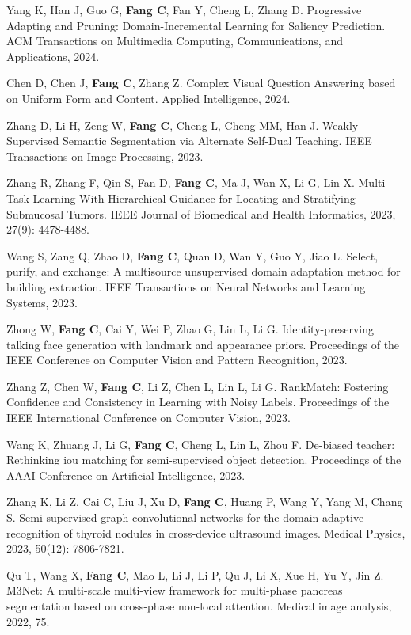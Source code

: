 \documentclass[a4paper,36pt]{article}
\newcommand{\tb}[1]{\textbf{#1}}
\newcommand{\resumeItemWithoutTitle}[1]{
  \item\justifying\small{
    {#1 \vspace{-2pt}}
  }
}
\begin{document}
\resumeItemWithoutTitle{Yang K, Han J, Guo G, \tb{Fang C}, Fan Y, Cheng L, Zhang D. Progressive Adapting and Pruning: Domain-Incremental Learning for Saliency Prediction. ACM Transactions on Multimedia Computing, Communications, and Applications, 2024.}

\resumeItemWithoutTitle{Chen D, Chen J, \tb{Fang C}, Zhang Z. Complex Visual Question Answering based on Uniform Form and Content. Applied Intelligence, 2024.}

\resumeItemWithoutTitle{Zhang D, Li H, Zeng W, \tb{Fang C}, Cheng L, Cheng MM, Han J. Weakly Supervised Semantic Segmentation via Alternate Self-Dual Teaching. IEEE Transactions on Image Processing, 2023.}

\resumeItemWithoutTitle{Zhang R, Zhang F, Qin S, Fan D, \tb{Fang C}, Ma J, Wan X, Li G, Lin X. Multi-Task Learning With Hierarchical Guidance for Locating and Stratifying Submucosal Tumors. IEEE Journal of Biomedical and Health Informatics, 2023, 27(9): 4478-4488.}

\resumeItemWithoutTitle{Wang S, Zang Q, Zhao D, \tb{Fang C}, Quan D, Wan Y, Guo Y, Jiao L. Select, purify, and exchange: A multisource unsupervised domain adaptation method for building extraction. IEEE Transactions on Neural Networks and Learning Systems, 2023.}

\resumeItemWithoutTitle{Zhong W, \tb{Fang C}, Cai Y, Wei P, Zhao G, Lin L, Li G. Identity-preserving talking face generation with landmark and appearance priors. Proceedings of the IEEE Conference on Computer Vision and Pattern Recognition, 2023. }

\resumeItemWithoutTitle{Zhang Z, Chen W, \tb{Fang C}, Li Z, Chen L, Lin L, Li G. RankMatch: Fostering Confidence and Consistency in Learning with Noisy Labels. Proceedings of the IEEE International Conference on Computer Vision, 2023. }

\resumeItemWithoutTitle{Wang K, Zhuang J, Li G, \tb{Fang C}, Cheng L, Lin L, Zhou F. De-biased teacher: Rethinking iou matching for semi-supervised object detection. Proceedings of the AAAI Conference on Artificial Intelligence, 2023.}

\resumeItemWithoutTitle{Zhang K, Li Z, Cai C, Liu J, Xu D, \tb{Fang C}, Huang P, Wang Y, Yang M, Chang S. Semi‐supervised graph convolutional networks for the domain adaptive recognition of thyroid nodules in cross‐device ultrasound images. Medical Physics, 2023, 50(12): 7806-7821.}

\resumeItemWithoutTitle{Qu T, Wang X, \tb{Fang C}, Mao L, Li J, Li P, Qu J, Li X, Xue H, Yu Y, Jin Z. M3Net: A multi-scale multi-view framework for multi-phase pancreas segmentation based on cross-phase non-local attention. Medical image analysis, 2022, 75.}
\end{document}
